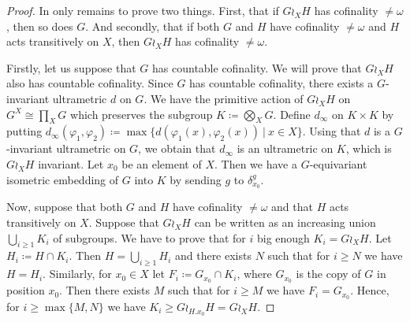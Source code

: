 \begin{proof}
In only remains to prove two things. First, that if $G\wr_X H$ has cofinality $\neq\omega$, then so does $G$. And secondly, that if both $G$ and $H$ have cofinality $\neq\omega$ and $H$ acts transitively on $X$, then $G\wr_X H$ has cofinality $\neq\omega$.

Firstly, let us suppose that $G$ has countable cofinality. We will prove that $G\wr_X H$ also has countable cofinality.
Since $G$ has countable cofinality, there exists a $G$-invariant ultrametric $d$ on $G$.
We have the primitive action of $G\wr_XH$ on $G^X\cong \prod_XG$ which preserves the subgroup $K\coloneqq\bigotimes_XG$.
Define $d_\infty$ on $K\times K$ by putting $d_\infty(\varphi_1,\varphi_2)\coloneqq\max\{d(\varphi_1(x),\varphi_2(x))\ |\ x\in X\}$.
Using that $d$ is a $G$-invariant ultrametric on $G$, we obtain that $d_\infty$ is an ultrametric on $K$, which is $G\wr_XH$ invariant.
Let $x_0$ be an element of $X$. Then we have a $G$-equivariant isometric embedding of $G$ into $K$ by sending $g$ to $\delta_{x_0}^g$.

Now, suppose that both $G$ and $H$ have cofinality $\neq\omega$ and that $H$ acts transitively on $X$.
Suppose that $G\wr_XH$ can be written as an increasing union $\bigcup_{i\geq 1} K_i$ of subgroups. We have to prove that for $i$ big enough $K_i=G\wr_XH$.
Let $H_i\coloneqq H\cap K_i$. Then $H=\bigcup_{i\geq 1} H_i$ and there exists $N$ such that for $i\geq N$ we have $H=H_i$.
Similarly, for $x_0\in X$ let $F_i\coloneqq G_{x_0}\cap K_i$, where $G_{x_0}$ is the copy of $G$ in position $x_0$.
Then there exists $M$ such that for $i\geq M$ we have $F_i=G_{x_0}$.
Hence, for $i\geq \max\{M,N\}$ we have $K_i\geq G\wr_{H.x_0}H=G\wr_XH$.
%
\end{proof}


